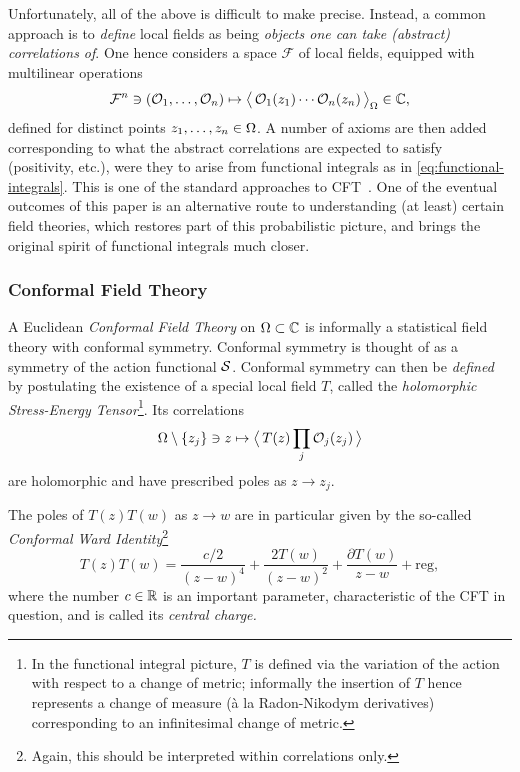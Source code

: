 \documentclass[12pt,oneside,english]{amsart}
\numberwithin{equation}{section}
\numberwithin{figure}{section}
\theoremstyle{plain}
\theoremstyle{plain}
\theoremstyle{plain}
\theoremstyle{plain}
\theoremstyle{remark}
\theoremstyle{definition}
\theoremstyle{plain}
\theoremstyle{plain}
\numberwithin{thm}{section}
\begin{document}
Unfortunately, all of the above is difficult to make precise. Instead,
a common approach is to \emph{define} local fields as being \emph{objects
one can take (abstract) correlations of}. One hence considers a space
$\mathcal{F}$ of local fields, equipped with multilinear operations
\[
\mathcal{F}^{n} \ni \left( {\mathcal{O}}_{1}, \ldots, {\mathcal{O}}_{n} \right)
\mapsto \big\langle\, { {\mathcal{O}}_{1}(z_{1}) \cdots {\mathcal{O}}_{n}(z_{n}) 
        } \, \big\rangle_{{\Omega}} \in \mathbb{C} ,
\]
defined for distinct points $z_{1}, \ldots, z_{n} \in {\Omega}$. A number
of axioms are then added corresponding to
what the abstract correlations
are expected to satisfy (positivity, etc.), were they to arise from
functional integrals as in \eqref{eq:functional-integrals}. This
is one of the standard approaches to CFT~\cite{segal,segal-ii}. 
One of the
eventual outcomes of this paper is an alternative route to understanding
(at least) certain field theories, which restores part of this probabilistic
picture, and brings the original spirit of functional integrals much
closer.

\subsubsection{Conformal Field Theory}

A Euclidean \emph{Conformal Field Theory }on ${\Omega} \subset \mathbb{C} $
is informally a statistical field theory with conformal symmetry.
Conformal symmetry is thought of as a symmetry of the action functional
${\mathcal{S}}$. Conformal symmetry can then be \emph{defined} by postulating
the existence of a special local field $T$, called the \emph{holomorphic
Stress-Energy Tensor}\footnote{In the functional integral picture,
$T$ is defined via the variation of
the action with respect to a change of metric; informally the insertion
of $T$ hence represents a change of measure (à la Radon-Nikodym
derivatives) corresponding to an infinitesimal change of metric. }.
Its correlations 
\[
{\Omega} \setminus \left\{  z_{j}  \right\} \ni z
    \mapsto \big\langle\, { T(z) \prod_{j} {\mathcal{O}}_{j}(z_{j}) } \, \big\rangle
\]
are holomorphic and have prescribed poles as $z \to  z_{j}$.

The poles of $T(z) T(w) $ as $z \to  w$ are in
particular given by the so-called 
\emph{Conformal Ward Identity}\footnote{Again, this should
be interpreted within 
correlations only.}
\begin{equation}
T(z) 
T(w) =\frac{c/2}{\left(z-w\right)^{4}}+\frac{2T(w) }{
\left(z-w\right)^{2}}+\frac{\partial 
T(w) }{z-w}+\mathrm{reg},\label{eq:t-t-ope}
\end{equation}
where the number $c\in \mathbb{R}$ is an important parameter, characteristic
of the CFT in question, and is called its \emph{central charge.}
\end{document}
